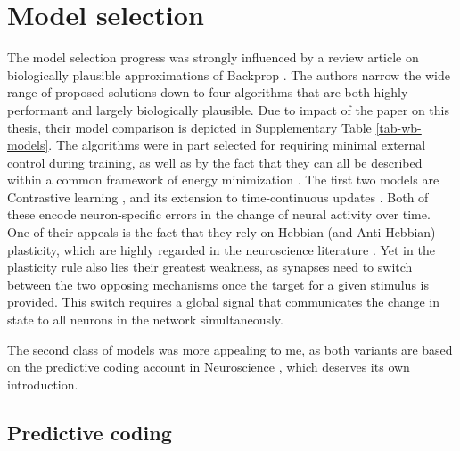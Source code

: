 \section{Model selection}

The model selection progress was strongly influenced by a review article on biologically plausible approximations of
Backprop \citep{whittington2019theories}. The authors narrow the wide range of proposed solutions down to four
algorithms that are both highly performant and largely biologically plausible. Due to impact of the paper on this
thesis, their model comparison is depicted in Supplementary Table \ref{tab-wb-models}. The algorithms were in part
selected for requiring minimal external control during training, as well as by the fact that they can all be described
within a common framework of energy minimization \citep{Scellier2017}. The first two models are Contrastive learning
\cite{OReilly1996}, and its extension to time-continuous updates \citep{Bengio2017}. Both of these encode
neuron-specific errors in the change of neural activity over time. One of their appeals is the fact that they rely on
Hebbian (and Anti-Hebbian) plasticity, which are highly regarded in the neuroscience literature
\citep{magee2020synaptic,Brea2016}. Yet in the plasticity rule also lies their greatest weakness, as synapses need to
switch between the two opposing mechanisms once the target for a given stimulus is provided. This switch requires a
global signal that communicates the change in state to all neurons in the network simultaneously.

The second class of models was more appealing to me, as both variants are based on the predictive coding account in
Neuroscience \citep{rao1999predictive}, which deserves its own introduction.

\subsection{Predictive coding}

